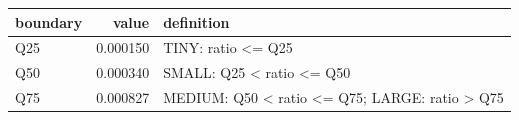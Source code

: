 \begin{tabular}{lrl}
\toprule
boundary & value & definition \\
\midrule
Q25 & 0.000150 & TINY: ratio <= Q25 \\
Q50 & 0.000340 & SMALL: Q25 < ratio <= Q50 \\
Q75 & 0.000827 & MEDIUM: Q50 < ratio <= Q75; LARGE: ratio > Q75 \\
\bottomrule
\end{tabular}
